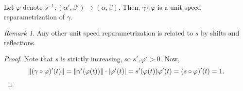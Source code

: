 \documentclass[11pt]{article}
\newcommand{\norm}[1]{\Vert #1 \Vert}
\theoremstyle{definition}
\theoremstyle{remark}
\newtheorem*{remark}{Remark}
\numberwithin{equation}{section}
\begin{document}
    \begin{lemma}
        Let $\varphi$ denote $s^{-1}\colon (\alpha', \beta') \to (\alpha, \beta)$.
        Then, $\gamma\circ \varphi$ is a unit speed reparametrization of $\gamma$.

        \begin{remark}
            Any other unit speed reparametrization is related to $s$ by shifts and
            reflections.
        \end{remark}
    \end{lemma}
    \begin{proof}
        Note that $s$ is strictly increasing, so $s', \varphi' > 0$. Now, \[
            \norm{(\gamma\circ \varphi)'(t)} = \norm{\gamma'(\varphi(t))}\cdot
            |\varphi'(t)| = s'(\varphi(t))\varphi'(t) = (s\circ \varphi)'(t) = 1. \qedhere
        \] 
    \end{proof}
\end{document}
